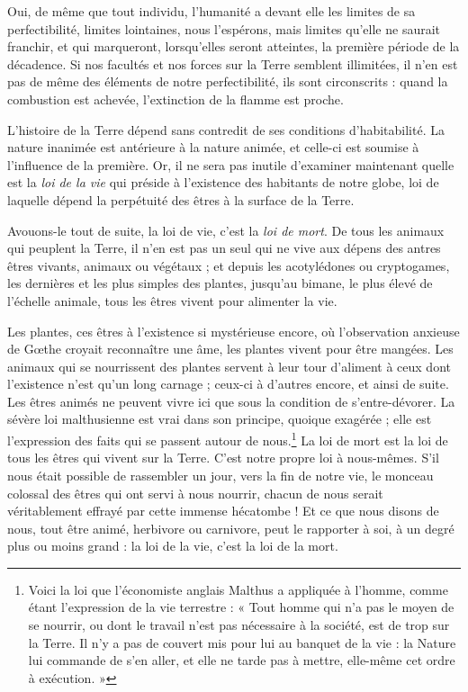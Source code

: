 \documentclass[a4paper, 11pt, oneside, landscape]{article}
\begin{document}
Oui, de même que tout individu, l'humanité a devant elle les limites de sa perfectibilité, limites lointaines, nous l'espérons, mais limites qu'elle ne saurait franchir, et qui marqueront, lorsqu'elles seront atteintes, la première période de la décadence. Si nos facultés et nos forces sur la Terre semblent illimitées, il n'en est pas de même des éléments de notre perfectibilité, ils sont circonscrits : quand la combustion est achevée, l'extinction de la flamme est proche.

L'histoire de la Terre dépend sans contredit de ses conditions d'habitabilité. La nature inanimée est antérieure à la nature animée, et celle-ci est soumise à l'influence de la première. Or, il ne sera pas inutile d'examiner maintenant quelle est la \emph{loi de la vie} qui préside à l'existence des habitants de notre globe, loi de laquelle dépend la perpétuité des êtres à la surface de la Terre.

Avouons-le tout de suite, la loi de vie, c'est la \emph{loi de mort}. De tous les animaux qui peuplent la Terre, il n'en est pas un seul qui ne vive aux dépens des antres êtres vivants, animaux ou végétaux ; et depuis les acotylédones ou cryptogames, les dernières et les plus simples des plantes, jusqu'au bimane, le plus élevé de l'échelle animale, tous les êtres vivent pour alimenter la vie.

Les plantes, ces êtres à l'existence si mystérieuse encore, où l'observation anxieuse de Gœthe croyait reconnaître une âme, les plantes vivent pour être mangées. Les animaux qui se nourrissent des plantes servent à leur tour d'aliment à ceux dont l'existence n'est qu'un long carnage ; ceux-ci à d'autres encore, et ainsi de suite. Les êtres animés ne peuvent vivre ici que sous la condition de s'entre-dévorer. La sévère loi malthusienne est vrai dans son principe, quoique exagérée ; elle est l'expression des faits qui se passent autour de nous.\footnote{Voici la loi que l'économiste anglais Malthus a appliquée à l'homme, comme étant l'expression de la vie terrestre : « Tout homme qui n'a pas le moyen de se nourrir, ou dont le travail n'est pas nécessaire à la société, est de trop sur la Terre. Il n'y a pas de couvert mis pour lui au banquet de la vie : la Nature lui commande de s'en aller, et elle ne tarde pas à mettre, elle-même cet ordre à exécution. »} La loi de mort est la loi de tous les êtres qui vivent sur la Terre. C'est notre propre loi à nous-mêmes. S'il nous était possible de rassembler un jour, vers la fin de notre vie, le monceau colossal des êtres qui ont servi à nous nourrir, chacun de nous serait véritablement effrayé par cette immense hécatombe ! Et ce que nous disons de nous, tout être animé, herbivore ou carnivore, peut le rapporter à soi, à un degré plus ou moins grand : la loi de la vie, c'est la loi de la mort.
\end{document}
